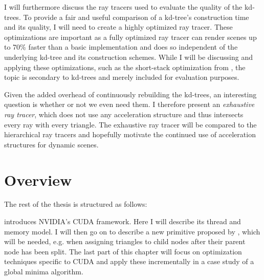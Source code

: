I will furthermore discuss the ray tracers used to evaluate the quality of the
kd-trees. To provide a fair and useful comparison of a kd-tree's construction
time and its quality, I will need to create a highly optimized ray tracer. These
optimizations are important as a fully optimized ray tracer can render scenes up
to 70\% faster than a basic implementation and does so independent of the
underlying kd-tree and its construction schemes. While I will be discussing and
applying these optimizations, such as the short-stack optimization from \horn{},
the topic is secondary to kd-trees and merely included for evaluation purposes.

Given the added overhead of continuously rebuilding the kd-trees, an interesting
question is whether or not we even need them. I therefore present an
\textit{exhaustive ray tracer}, which does not use any acceleration structure
and thus intersects every ray with every triangle. The exhaustive ray tracer
will be compared to the hierarchical ray tracers and hopefully motivate the
continued use of acceleration structures for dynamic scenes.

\section{Overview}

The rest of the thesis is structured as follows:




 introduces NVIDIA's CUDA framework. Here I will describe
its thread and memory model. I will then go on to describe a new primitive
proposed by \sengupta{}, which will be needed, e.g. when assigning triangles to
child nodes after their parent node has been split. The last part of this
chapter will focus on optimization techniques specific to CUDA and apply these
incrementally in a case study of a global minima algorithm.


